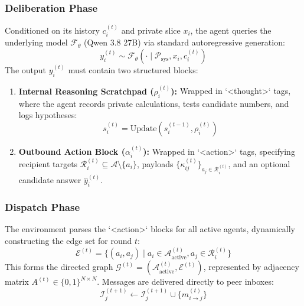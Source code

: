 \documentclass{ieeeaccess}
\begin{document}
\subsubsection{Deliberation Phase}
Conditioned on its history $c_i^{(t)}$ and private slice $x_i$, the agent queries the underlying model $\mathcal{F}_{\theta}$ (Qwen 3.8 27B) via standard autoregressive generation:
\begin{equation}
\label{eq:autoreg_gen}
y_i^{(t)} \sim \mathcal{F}_{\theta}\left( \cdot \mid \mathcal{P}_{\text{sys}}, x_i, c_i^{(t)} \right)
\end{equation}
The output $y_i^{(t)}$ must contain two structured blocks:
\begin{enumerate}
    \item \textbf{Internal Reasoning Scratchpad ($\rho_i^{(t)}$):} Wrapped in `<thought>` tags, where the agent records private calculations, tests candidate numbers, and logs hypotheses:
    \begin{equation}
    \label{eq:state_update}
    s_i^{(t)} = \text{Update}\left( s_i^{(t-1)}, \rho_i^{(t)} \right)
    \end{equation}
    \item \textbf{Outbound Action Block ($\alpha_i^{(t)}$):} Wrapped in `<action>` tags, specifying recipient targets $\mathcal{R}_i^{(t)} \subseteq \mathcal{A} \setminus \{a_i\}$, payloads $\{ \kappa_{ij}^{(t)} \}_{a_j \in \mathcal{R}_i^{(t)}}$, and an optional candidate answer $\hat{y}_i^{(t)}$.
\end{enumerate}

\subsubsection{Dispatch Phase}
The environment parses the `<action>` blocks for all active agents, dynamically constructing the edge set for round $t$:
\begin{equation}
\label{eq:edge_def}
\mathcal{E}^{(t)} = \{ (a_i, a_j) \mid a_i \in \mathcal{A}_{\text{active}}^{(t)}, a_j \in \mathcal{R}_i^{(t)} \}
\end{equation}
This forms the directed graph $\mathcal{G}^{(t)} = (\mathcal{A}_{\text{active}}^{(t)}, \mathcal{E}^{(t)})$, represented by adjacency matrix $A^{(t)} \in \{0, 1\}^{N \times N}$. Messages are delivered directly to peer inboxes:
\begin{equation}
\label{eq:msg_route}
\mathcal{I}_j^{(t+1)} \leftarrow \mathcal{I}_j^{(t+1)} \cup \{ m_{i \to j}^{(t)} \}
\end{equation}
\end{document}
